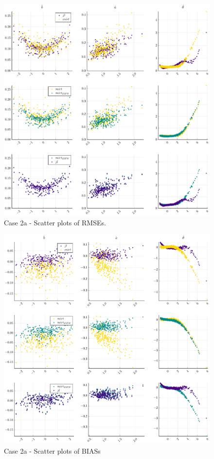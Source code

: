 \begin{figure}[H] 
	\centering
	\includegraphics[width=\textwidth]{Figures/2a/RMSEscatter.pdf}
	\caption{Case 2a - Scatter plots of RMSEs.}
	\label{fig:spRMSE2a}
\end{figure}
\begin{figure}[H] 
	\centering
	\includegraphics[width=\textwidth]{Figures/2a/BIASscatter.pdf}
	\caption{Case 2a - Scatter plots of BIASs }
	\label{fig:spBIAS2a}
\end{figure}
